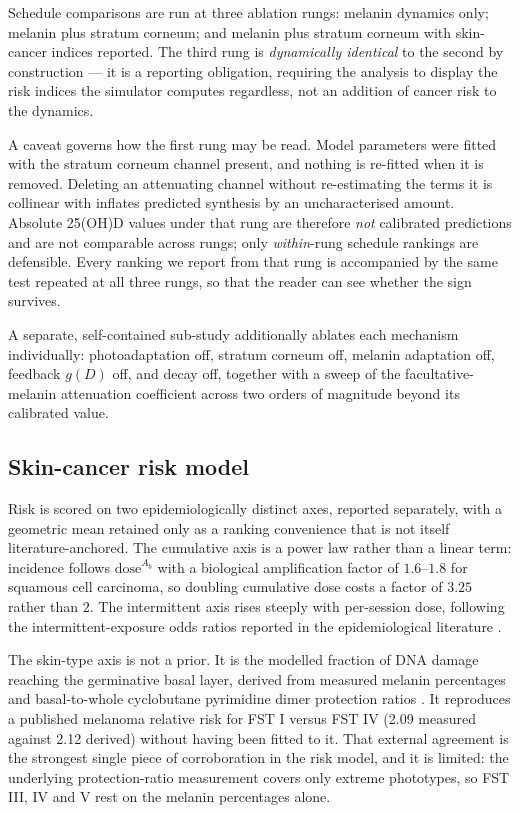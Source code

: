 \documentclass[11pt]{article}
\begin{document}
Schedule comparisons are run at three ablation rungs: melanin dynamics
only; melanin plus stratum corneum; and melanin plus stratum corneum
with skin-cancer indices reported. The third rung is
\emph{dynamically identical} to the second by construction --- it is a
reporting obligation, requiring the analysis to display the risk
indices the simulator computes regardless, not an addition of cancer
risk to the dynamics.

A caveat governs how the first rung may be read. Model parameters were
fitted with the stratum corneum channel present, and nothing is
re-fitted when it is removed. Deleting an attenuating channel without
re-estimating the terms it is collinear with inflates predicted
synthesis by an uncharacterised amount. Absolute 25(OH)D values under
that rung are therefore \emph{not} calibrated predictions and are not
comparable across rungs; only \emph{within}-rung schedule rankings are
defensible. Every ranking we report from that rung is accompanied by
the same test repeated at all three rungs, so that the reader can see
whether the sign survives.

A separate, self-contained sub-study additionally ablates each
mechanism individually: photoadaptation off, stratum corneum off,
melanin adaptation off, feedback $g(D)$ off, and decay off, together
with a sweep of the facultative-melanin attenuation coefficient across
two orders of magnitude beyond its calibrated value.

\subsection{Skin-cancer risk model}

Risk is scored on two epidemiologically distinct axes, reported
separately, with a geometric mean retained only as a ranking
convenience that is not itself literature-anchored. The cumulative
axis is a power law rather than a linear term: incidence follows
$\mathrm{dose}^{A_b}$ with a biological amplification factor of
$1.6$--$1.8$ for squamous cell carcinoma, so doubling cumulative dose
costs a factor of $3.25$ rather than $2$. The intermittent axis rises
steeply with per-session dose, following the intermittent-exposure
odds ratios reported in the epidemiological literature
\citep{elwood1997,leiter2009,calzavarapinton2015}.

The skin-type axis is not a prior. It is the modelled fraction of DNA
damage reaching the germinative basal layer, derived from measured
melanin percentages and basal-to-whole cyclobutane pyrimidine dimer
protection ratios \citep{shih2018,fajuyigbe2018}. It reproduces a
published melanoma relative risk for FST I versus FST IV (2.09
measured against 2.12 derived) without having been fitted to it. That
external agreement is the strongest single piece of corroboration in
the risk model, and it is limited: the underlying protection-ratio
measurement covers only extreme phototypes, so FST III, IV and V rest
on the melanin percentages alone.
\end{document}
